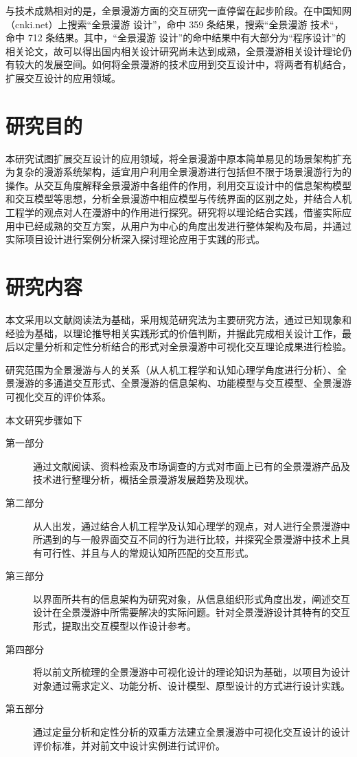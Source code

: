 与技术成熟相对的是，全景漫游方面的交互研究一直停留在起步阶段。在中国知网（cnki.net）上搜索“全景漫游 设计”，命中 359 条结果，搜索“全景漫游 技术“，命中 712 条结果。其中，“全景漫游 设计”的命中结果中有大部分为“程序设计”的相关论文，故可以得出国内相关设计研究尚未达到成熟，全景漫游相关设计理论仍有较大的发展空间。如何将全景漫游的技术应用到交互设计中，将两者有机结合，扩展交互设计的应用领域。

\section{研究目的}
本研究试图扩展交互设计的应用领域，将全景漫游中原本简单易见的场景架构扩充为复杂的漫游系统架构，适宜用户利用全景漫游进行包括但不限于场景漫游行为的操作。从交互角度解释全景漫游中各组件的作用，利用交互设计中的信息架构模型和交互模型等思想，分析全景漫游中相应模型与传统界面的区别之处，并结合人机工程学的观点对人在漫游中的作用进行探究。研究将以理论结合实践，借鉴实际应用中已经成熟的交互方案，从用户为中心的角度出发进行整体架构及布局，并通过实际项目设计进行案例分析深入探讨理论应用于实践的形式。

\section{研究内容}
本文采用以文献阅读法为基础，采用规范研究法为主要研究方法，通过已知现象和经验为基础，以理论推导相关实践形式的价值判断，并据此完成相关设计工作，最后以定量分析和定性分析结合的形式对全景漫游中可视化交互理论成果进行检验。

研究范围为全景漫游与人的关系（从人机工程学和认知心理学角度进行分析）、全景漫游的多通道交互形式、全景漫游的信息架构、功能模型与交互模型、全景漫游可视化交互的评价体系。

本文研究步骤如下

\begin{description}
\item[第一部分] 通过文献阅读、资料检索及市场调查的方式对市面上已有的全景漫游产品及技术进行整理分析，概括全景漫游发展趋势及现状。

\item[第二部分] 从人出发，通过结合人机工程学及认知心理学的观点，对人进行全景漫游中所遇到的与一般界面交互不同的行为进行比较，并探究全景漫游中技术上具有可行性、并且与人的常规认知所匹配的交互形式。

\item[第三部分] 以界面所共有的信息架构为研究对象，从信息组织形式角度出发，阐述交互设计在全景漫游中所需要解决的实际问题。针对全景漫游设计其特有的交互形式，提取出交互模型以作设计参考。

\item[第四部分] 将以前文所梳理的全景漫游中可视化设计的理论知识为基础，以项目为设计对象通过需求定义、功能分析、设计模型、原型设计的方式进行设计实践。

\item[第五部分] 通过定量分析和定性分析的双重方法建立全景漫游中可视化交互设计的设计评价标准，并对前文中设计实例进行试评价。

\end{description}


